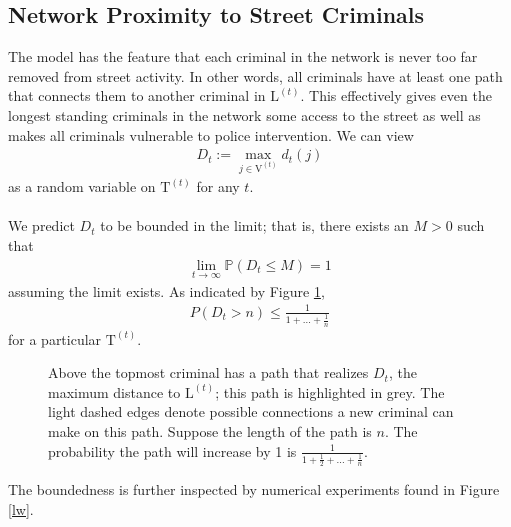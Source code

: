 \documentclass[%
 reprint,
 amsmath,amssymb,
 aps,
]{revtex4-1}
\newcommand{\bb}[1]{\mathbb{#1}}
\renewcommand{\L}{\mathrm{L}}
\newcommand{\T}{\mathrm{T}}
\newcommand{\V}{\mathrm{V}}
\theoremstyle{plain}
\theoremstyle{definition}
\begin{document}
\subsection*{Network Proximity to Street Criminals}

The model has the feature that each criminal in the network is never too far removed from street activity.  In other words, all criminals have at least one path that connects them to another criminal in $\L^{(t)}$.  This effectively gives even the longest standing criminals in the network some access to the street as well as makes all criminals vulnerable to police intervention.  We can view
\begin{align}
D_t:= \displaystyle{\max_{j \in \V^{(t)}} d_t(j)}
\end{align}
 as a random variable on $\T^{(t)}$ for any $t$.\\
\\
We predict $D_t$ to be bounded in the limit; that is, there exists an $M>0$ such that
\begin{align}
\lim_{t \to \infty}\bb P( D_t\leq M) =1
\end{align}
assuming the limit exists.  As indicated by Figure \ref{harmseries},
\begin{align}
P\left(D_t > n\right) \leq \frac{1}{1+ \hdots + \frac{1}{n}}
\end{align}
for a particular $\T^{(t)}$. 
\begin{figure}
\centering
{}
\caption{Above the topmost criminal has a path that realizes $D_t$, the maximum distance to $\L^{(t)}$; this path is highlighted in grey.  The light dashed edges denote possible connections a new criminal can make on this path.  Suppose the length of the path is $n$.  The probability the path will increase by 1 is $\frac{1}{ 1+ \frac 12 + \hdots + \frac 1n}$.}\label{harmseries}
\end{figure}
The boundedness is further inspected by numerical experiments found in Figure \ref{lw}.
\end{document}
